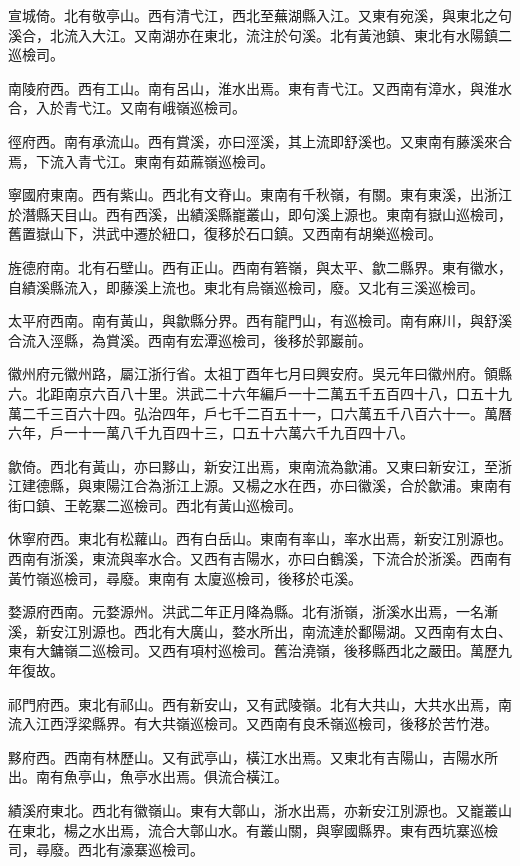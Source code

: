 宣城倚。北有敬亭山。西有清弋江，西北至蕪湖縣入江。又東有宛溪，與東北之句溪合，北流入大江。又南湖亦在東北，流注於句溪。北有黃池鎮、東北有水陽鎮二巡檢司。

南陵府西。西有工山。南有呂山，淮水出焉。東有青弋江。又西南有漳水，與淮水合，入於青弋江。又南有峨嶺巡檢司。

徑府西。南有承流山。西有賞溪，亦曰涇溪，其上流即舒溪也。又東南有藤溪來合焉，下流入青弋江。東南有茹蔴嶺巡檢司。

寧國府東南。西有紫山。西北有文脊山。東南有千秋嶺，有關。東有東溪，出浙江於潛縣天目山。西有西溪，出績溪縣巃叢山，即句溪上源也。東南有嶽山巡檢司，舊置嶽山下，洪武中遷於紐口，復移於石口鎮。又西南有胡樂巡檢司。

旌德府南。北有石壁山。西有正山。西南有箬嶺，與太平、歙二縣界。東有徽水，自績溪縣流入，即藤溪上流也。東北有烏嶺巡檢司，廢。又北有三溪巡檢司。

太平府西南。南有黃山，與歙縣分界。西有龍門山，有巡檢司。南有麻川，與舒溪合流入涇縣，為賞溪。西南有宏潭巡檢司，後移於郭巖前。

徽州府元徽州路，屬江浙行省。太祖丁酉年七月曰興安府。吳元年曰徽州府。領縣六。北距南京六百八十里。洪武二十六年編戶一十二萬五千五百四十八，口五十九萬二千三百六十四。弘治四年，戶七千二百五十一，口六萬五千八百六十一。萬曆六年，戶一十一萬八千九百四十三，口五十六萬六千九百四十八。

歙倚。西北有黃山，亦曰黟山，新安江出焉，東南流為歙浦。又東曰新安江，至浙江建德縣，與東陽江合為浙江上源。又楊之水在西，亦曰徽溪，合於歙浦。東南有街口鎮、王乾寨二巡檢司。西北有黃山巡檢司。

休寧府西。東北有松蘿山。西有白岳山。東南有率山，率水出焉，新安江別源也。西南有浙溪，東流與率水合。又西有吉陽水，亦曰白鶴溪，下流合於浙溪。西南有黃竹嶺巡檢司，尋廢。東南有太廈巡檢司，後移於屯溪。

婺源府西南。元婺源州。洪武二年正月降為縣。北有浙嶺，浙溪水出焉，一名漸溪，新安江別源也。西北有大廣山，婺水所出，南流達於鄱陽湖。又西南有太白、東有大鏞嶺二巡檢司。又西有項村巡檢司。舊治澆嶺，後移縣西北之嚴田。萬歷九年復故。

祁門府西。東北有祁山。西有新安山，又有武陵嶺。北有大共山，大共水出焉，南流入江西浮梁縣界。有大共嶺巡檢司。又西南有良禾嶺巡檢司，後移於苦竹港。

黟府西。西南有林歷山。又有武亭山，橫江水出焉。又東北有吉陽山，吉陽水所出。南有魚亭山，魚亭水出焉。俱流合橫江。

績溪府東北。西北有徽嶺山。東有大鄣山，浙水出焉，亦新安江別源也。又巃叢山在東北，楊之水出焉，流合大鄣山水。有叢山關，與寧國縣界。東有西坑寨巡檢司，尋廢。西北有濠寨巡檢司。

